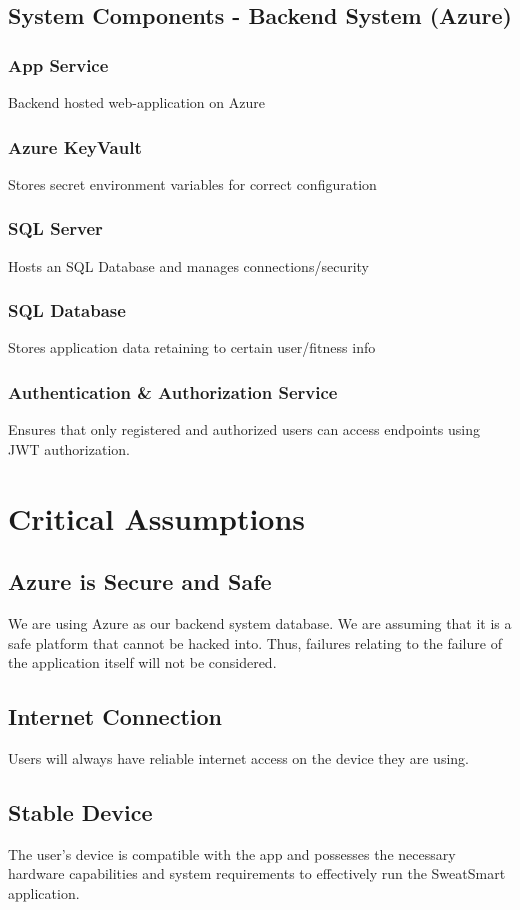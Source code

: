 \documentclass{article}
\begin{document}
\subsection{System Components - Backend System (Azure)}
\subsubsection{App Service} Backend hosted web-application on Azure
\subsubsection{Azure KeyVault} Stores secret environment variables for correct configuration
\subsubsection{SQL Server} Hosts an SQL Database and manages connections/security
\subsubsection{SQL Database} Stores application data retaining to certain user/fitness info
\subsubsection{Authentication \& Authorization Service} Ensures that only registered and authorized users can access endpoints using JWT authorization.

\section{Critical Assumptions}
\subsection{Azure is Secure and Safe} 
We are using Azure as our backend system database. We are assuming that it is a safe platform that cannot be hacked into. Thus, failures relating to the failure of the application itself will not be considered. 
\subsection{Internet Connection}
Users will always have reliable internet access on the device they are using.
\subsection{Stable Device}
The user's device is compatible with the app and possesses the necessary hardware capabilities and system requirements to effectively run the SweatSmart application.
\end{document}
